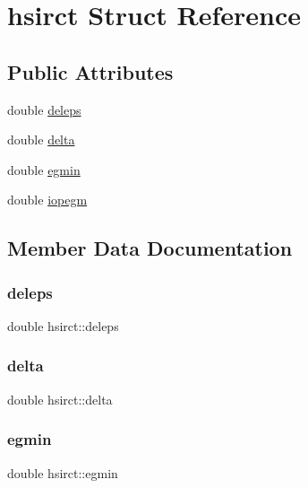 \hypertarget{structhsirct}{}\section{hsirct Struct Reference}
\label{structhsirct}
\subsection*{Public Attributes}
\begin{DoxyCompactItemize}
\item 
double \hyperlink{structhsirct_a1ddb1e238349cc3411923a32f79ee87f}{deleps}
\item 
double \hyperlink{structhsirct_a8de7caef805ad166386974cc1401552c}{delta}
\item 
double \hyperlink{structhsirct_a8eda989a0ce8d839e845c5b20ea18507}{egmin}
\item 
double \hyperlink{structhsirct_a2ec6a54f3f5d6fabc351b553cf77b304}{iopegm}
\end{DoxyCompactItemize}


\subsection{Member Data Documentation}
\mbox{\label{structhsirct_a1ddb1e238349cc3411923a32f79ee87f}} 
\subsubsection{\texorpdfstring{deleps}{deleps}}
{\footnotesize\ttfamily double hsirct\+::deleps}

\mbox{\label{structhsirct_a8de7caef805ad166386974cc1401552c}} 
\subsubsection{\texorpdfstring{delta}{delta}}
{\footnotesize\ttfamily double hsirct\+::delta}

\mbox{\label{structhsirct_a8eda989a0ce8d839e845c5b20ea18507}} 
\subsubsection{\texorpdfstring{egmin}{egmin}}
{\footnotesize\ttfamily double hsirct\+::egmin}

